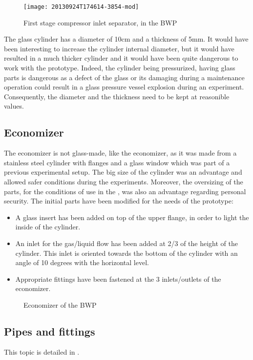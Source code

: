 \begin{figure}[htbp]
  \centering
  \texttt{[image: 20130924T174614-3854-mod]}
  \caption{First stage compressor inlet separator, in the BWP}
  \label{fig:bwp-1st-sep}
\end{figure}

The glass cylinder has a diameter of 10cm and a thickness of 5mm. It
would have been interesting to increase the cylinder internal diameter,
but it would have resulted in a much thicker cylinder and it would have
been quite dangerous to work with the prototype. Indeed, the cylinder
being pressurized, having glass parts is dangerous as a defect of the
glass or its damaging during a maintenance operation could result in a
glass pressure vessel explosion during an experiment. Consequently, the
diameter and the thickness need to be kept at reasonible values.


\subsection{Economizer}
\label{sec:bwp-eco}

The \BWP{} economizer is not glass-made, like the \AWP{} economizer,
as it was made from a stainless steel cylinder with flanges and a
glass window which was part of a previous experimental setup. The big
size of the cylinder was an advantage and allowed safer conditions
during the experiments. Moreover, the oversizing of the parts, for the
conditions of use in the \BWP{}, was also an advantage regarding
personal security. The initial parts have been modified for the needs
of the prototype:

\begin{itemize}
\item A glass insert has been added on top of the upper flange, in
order to light the inside of the cylinder.
\item An inlet for the gas/liquid flow has been added at 2/3 of the
height of the cylinder. This inlet is oriented towards the bottom of the
cylinder with an angle of 10 degrees with the horizontal level.
\item Appropriate fittings have been fastened at the 3 inlets/outlets of
the economizer.
\end{itemize}

\begin{figure}[htbp]
  \centering {}
  \hspace{1em} 
  \caption{Economizer of the BWP}
  \label{fig:bwp-eco}
\end{figure}

\subsection{Pipes and fittings}
\label{sec:bwp-pipes}

This topic is detailed in .

\FloatBarrier



\label{sec:bwp-components-refs}
